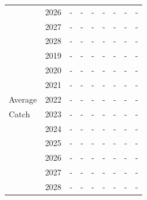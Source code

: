 \documentclass[12pt,]{article}
\begin{document}
\begin{table}[ht]
{\begin{tabular}{l|cc|>{\centering}p{.7in}c|>{\centering}p{.7in}c|>{\centering}p{.7in}c}
   & 2026 & - & - & - & - & - & - & - \\ 
   & 2027 & - & - & - & - & - & - & - \\ 
   & 2028 & - & - & - & - & - & - & - \\ 
   \hline
 & 2019 & - & - & - & - & - & - & - \\ 
   & 2020 & - & - & - & - & - & - & - \\ 
   & 2021 & - & - & - & - & - & - & - \\ 
  Average & 2022 & - & - & - & - & - & - & - \\ 
  Catch & 2023 & - & - & - & - & - & - & - \\ 
   & 2024 & - & - & - & - & - & - & - \\ 
   & 2025 & - & - & - & - & - & - & - \\ 
   & 2026 & - & - & - & - & - & - & - \\ 
   & 2027 & - & - & - & - & - & - & - \\ 
   & 2028 & - & - & - & - & - & - & - \\ 
   \hline
\end{tabular}
}
\end{table}\begin{table}[ht]
\centering
\caption{Summary of 10-year projections 
                                                  beginning in 2018 for 
                                                  alternate states of nature based 
                                                  on an axis of uncertainty for the Southern model.  Columns range over low, 
                                                  mid, and high states of nature, and rows 
                                                  range over different assumptions of catch 
                                                  levels. An entry of "--" indicates that the 
                                                  stock is driven to very low abundance under the
                                                  particular scenario.} 
\label{tab:Decision_table_mod2}
\end{table}
\end{document}
